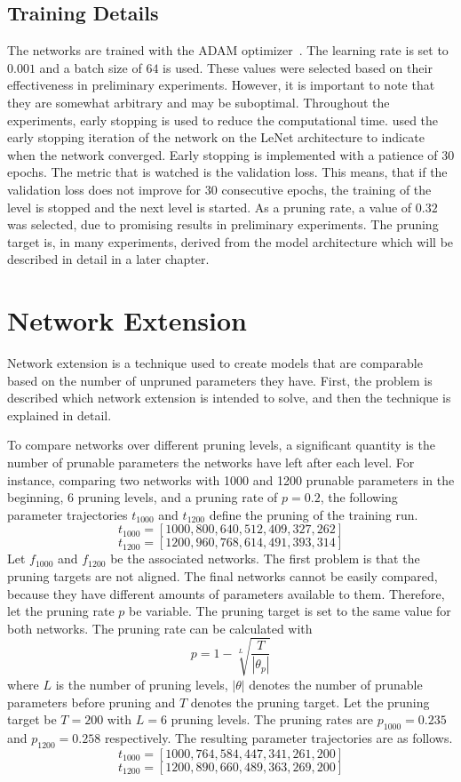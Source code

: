 \subsection{Training Details}
The networks are trained with the ADAM optimizer~\autocite{ADAM}.
The learning rate is set to $0.001$ and a batch size of $64$ is used.
These values were selected based on their effectiveness in preliminary experiments. 
However, it is important to note that they are somewhat arbitrary and may be suboptimal.
Throughout the experiments, early stopping is used to reduce the computational time.
\textcite{LTH} used the early stopping iteration of the network on the LeNet architecture to indicate when the network converged.
Early stopping is implemented with a patience of $30$ epochs.
The metric that is watched is the validation loss.
This means, that if the validation loss does not improve for $30$ consecutive epochs, the training of the level is stopped and the next level is started.
As a pruning rate, a value of $0.32$ was selected, due to promising results in preliminary experiments.
The pruning target is, in many experiments, derived from the model architecture which will be described in detail in a later chapter.



\section{Network Extension}\label{sec:extension}
Network extension is a technique used to create models that are comparable based on the number of unpruned parameters they have. 
First, the problem is described which network extension is intended to solve, and then the technique is explained in detail.

To compare networks over different pruning levels, a significant quantity is the number of prunable parameters the networks have left after each level.
For instance, comparing two networks with 1000 and 1200 prunable parameters in the beginning, 6 pruning levels, and a pruning rate of $p=0.2$, the following parameter trajectories $t_{1000}$ and $t_{1200}$ define the pruning of the training run.
\[ t_{1000} = [1000, 800, 640, 512, 409, 327, 262] \]
\[ t_{1200} = [1200, 960, 768, 614, 491, 393, 314] \]
Let $f_{1000}$ and $f_{1200}$ be the associated networks.
The first problem is that the pruning targets are not aligned.
The final networks cannot be easily compared, because they have different amounts of parameters available to them.
Therefore, let the pruning rate $p$ be variable.
The pruning target is set to the same value for both networks.
The pruning rate can be calculated with 
\[ p = 1 - \sqrt[L]{\frac{T}{|\theta_p|}} \]
where $L$ is the number of pruning levels, $|\theta|$ denotes the number of prunable parameters before pruning and $T$ denotes the pruning target.
Let the pruning target be $T=200$ with $L=6$ pruning levels.
The pruning rates are $p_{1000} = 0.235$ and $p_{1200} = 0.258$ respectively.
The resulting parameter trajectories are as follows.
\[ t_{1000} = [1000, 764, 584, 447, 341, 261, 200] \]
\[ t_{1200} = [1200, 890, 660, 489, 363, 269, 200] \]

